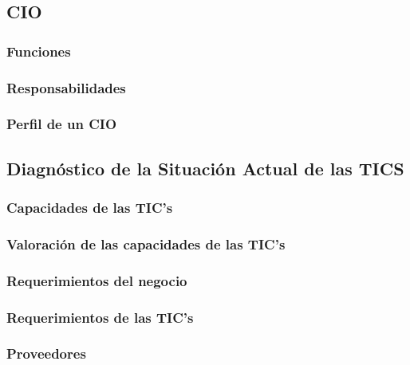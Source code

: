 
\subsection{CIO}
\subsubsection{Funciones}
\lipsum[1]
\subsubsection{Responsabilidades }
\lipsum[1]
\subsubsection{Perfil de un CIO}
\lipsum[1]




\subsection{Diagnóstico de la Situación Actual de las TICS}
\subsubsection{Capacidades de las TIC’s }
\lipsum[1]
\subsubsection{Valoración de las capacidades de las TIC’s }
\lipsum[1]
\subsubsection{Requerimientos del negocio}
\lipsum[1]
\subsubsection{Requerimientos de las TIC’s}
\lipsum[1]
\subsubsection{Proveedores }
\lipsum[1]
